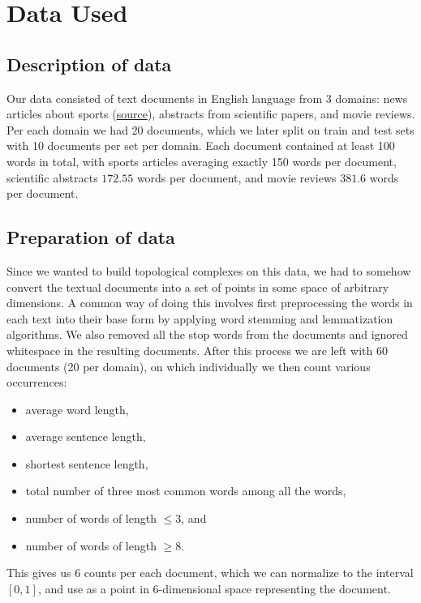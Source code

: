 \section{Data Used}
\label{sec:data_used}

\subsection{Description of data}
\label{sub:description_of_data}

Our data consisted of text documents in English language from 3 domains: news
articles about sports (\href{http://mlg.ucd.ie/datasets/bbc.html}{source}),
abstracts from scientific papers, and movie reviews. Per each domain we had 20
documents, which we later split on train and test sets with 10 documents per
set per domain. Each document contained at least 100 words in total, with
sports articles averaging exactly 150 words per document, scientific abstracts
$172.55$ words per document, and movie reviews $381.6$ words per document.

\subsection{Preparation of data}
\label{sub:preparation_of_data}

Since we wanted to build topological complexes on this data, we had to somehow
convert the textual documents into a set of points in some space of arbitrary
dimensions. A common way of doing this involves first preprocessing the words
in each text into their base form by applying word stemming and lemmatization
algorithms. We also removed all the stop words from the documents and ignored
whitespace in the resulting documents. After this process we are left with 60
documents (20 per domain), on which individually we then count various
occurrences:

\begin{itemize}
  \item average word length,
  \item average sentence length,
  \item shortest sentence length,
  \item total number of three most common words among all the words,
  \item number of words of length $\le 3$, and
  \item number of words of length $\ge 8$.
\end{itemize}

This gives us 6 counts per each document, which we can normalize to the
interval $[0, 1]$, and use as a point in $6$-dimensional space representing
the document.

